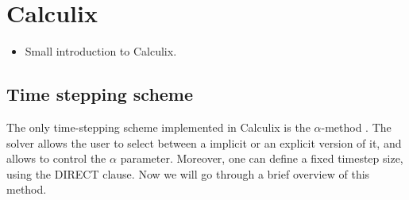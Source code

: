 \documentclass[
  english,        %
  font=times,     %
  onecolumn,      %
]{tumarticle}
\begin{document}
\section{Calculix}
\begin{itemize}
    \item Small introduction to Calculix.
    
\end{itemize}

\subsection{Time stepping scheme}
The only time-stepping scheme implemented in Calculix is the $\alpha$-method \cite{dhondt2017calculix}. The solver allows the user to select between a implicit or an explicit version of it, and allows to control the $\alpha$ parameter. Moreover, one can define a fixed timestep size, using the DIRECT clause. Now we will go through a brief overview of this method.
\end{document}
